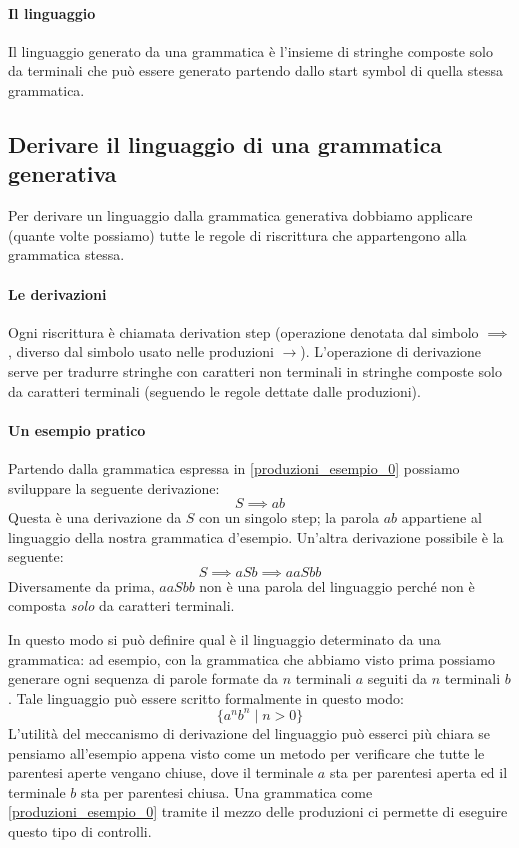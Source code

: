\documentclass[class=book, crop=false, oneside, 12pt]{standalone}
\begin{document}
\paragraph{Il linguaggio}
Il linguaggio generato da una grammatica è l’insieme di stringhe composte solo da terminali che può essere generato partendo dallo start symbol di quella stessa grammatica.

\subsection{Derivare il linguaggio di una grammatica generativa}
Per derivare un linguaggio dalla grammatica generativa dobbiamo applicare (quante volte possiamo) tutte le regole di riscrittura che appartengono alla grammatica stessa. 

\paragraph{Le derivazioni}
Ogni riscrittura è chiamata derivation step (operazione denotata dal simbolo \(\implies\), diverso dal simbolo usato nelle produzioni \(\to\)). L’operazione di derivazione serve per tradurre stringhe con caratteri non terminali in stringhe composte solo da caratteri terminali (seguendo le regole dettate dalle produzioni).

\paragraph{Un esempio pratico}
Partendo dalla grammatica espressa in \ref{produzioni_esempio_0} possiamo sviluppare la seguente derivazione:
\begin{equation}
    S \implies ab
\end{equation}
Questa è una derivazione da \(S\) con un singolo step; la parola \(ab\) appartiene al linguaggio della nostra grammatica d’esempio.
Un'altra derivazione possibile è la seguente:
\begin{equation}
    S \implies aSb \implies aaSbb
\end{equation}
Diversamente da prima, \(aaSbb\) non è una parola del linguaggio perché non è composta \emph{solo} da caratteri terminali.

In questo modo si può definire qual è il linguaggio determinato da una grammatica: ad esempio, con la grammatica che abbiamo visto prima possiamo generare ogni sequenza di parole formate da \(n\) terminali \(a\) seguiti da \(n\) terminali \(b\).
Tale linguaggio può essere scritto formalmente in questo modo:
\begin{equation}
    \{a^n b^n \mid n>0\}
\end{equation}
L'utilità del meccanismo di derivazione del linguaggio può esserci più chiara se pensiamo all'esempio appena visto come un metodo per verificare che tutte le parentesi aperte vengano chiuse, dove il terminale \(a\) sta per parentesi aperta ed il terminale \(b\) sta per parentesi chiusa. Una grammatica come \ref{produzioni_esempio_0} tramite il mezzo delle produzioni ci permette di eseguire questo tipo di controlli.
\end{document}
